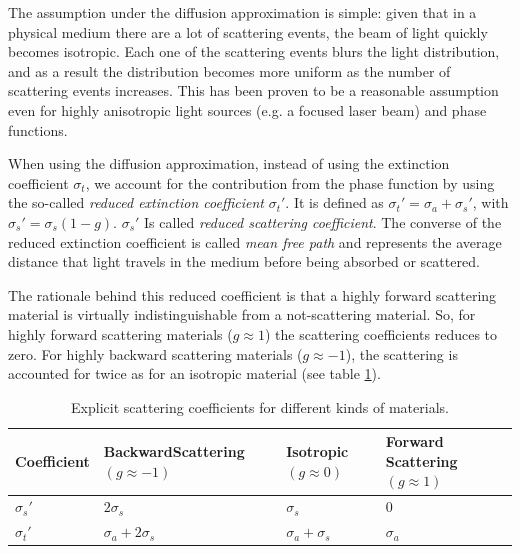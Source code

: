 The assumption under the diffusion approximation is simple: given that in a physical medium there are a lot of scattering events, the beam of light quickly becomes isotropic. Each one of the scattering events blurs the light distribution, and as a result the distribution becomes more uniform as the number of scattering events increases. This has been proven to be a reasonable assumption even for highly anisotropic light sources (e.g. a focused laser beam) and phase functions.

When using the diffusion approximation, instead of using the extinction coefficient $\sigma_t$, we account for the contribution from the phase function by using the so-called \emph{reduced extinction coefficient} $\sigma_t'$. It is defined as $\sigma_t' = \sigma_a + \sigma_s'$, with $\sigma_s' = \sigma_s (1 - g)$. $\sigma_s'$ Is called \emph{reduced scattering coefficient}. The converse of the reduced extinction coefficient is called \emph{mean free path} and represents the average distance that light travels in the medium before being absorbed or scattered.

The rationale behind this reduced coefficient is that a highly forward scattering material is virtually indistinguishable from a not-scattering material. So, for highly forward scattering materials ($g \approx 1$) the scattering coefficients reduces to zero. For highly backward scattering materials ($g \approx -1$), the scattering is accounted for twice as for an isotropic material (see table \ref{table:coefficients}).

\renewcommand{\arraystretch}{1.8}
\begin{table}[!ht]
    \centering
    \begin{tabularx}{0.95\textwidth}{|X|X|X|X|}
    \hline
    Coefficient   & Backward\linebreak Scattering \linebreak $(g \approx -1)$ & Isotropic \linebreak\linebreak $(g \approx 0)$ & Forward \linebreak Scattering \linebreak $(g \approx 1)$ \\ \hline
    $\sigma_s'$   & $2 \sigma_s$ & $\sigma_s$ & 0   \\ \hline
    $\sigma_t'$   & $\sigma_a + 2 \sigma_s$ & $\sigma_a + \sigma_s$ &  $\sigma_a$  \\ \hline
    \end{tabularx}
\caption{Explicit scattering coefficients for different kinds of materials.}
\label{table:coefficients}
\end{table}

